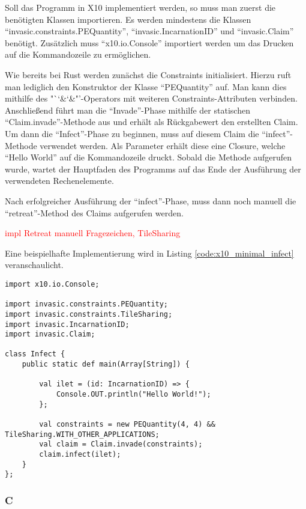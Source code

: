 Soll das Programm in X10 implementiert werden, so muss man zuerst die benötigten Klassen importieren. Es werden 
mindestens die Klassen "`invasic.constraints.PEQuantity"', "`invasic.IncarnationID"' und "`invasic.Claim"'
benötigt. Zusätzlich muss "`x10.io.Console"' importiert werden um das Drucken auf die Kommandozeile zu
ermöglichen.

Wie bereits bei Rust werden zunächst die Constraints initialisiert. Hierzu
ruft man lediglich den Konstruktor der Klasse "`PEQuantity"' auf. Man kann dies mithilfe
des "`\char`&\char`&"'-Operators mit weiteren Constraints-Attributen verbinden.
Anschließend führt man die "`Invade"'-Phase mithilfe der statischen "`Claim.invade"'-Methode aus und erhält
als Rückgabewert den erstellten Claim.
Um dann die "`Infect"'-Phase zu beginnen, muss auf diesem Claim die "`infect"'-Methode verwendet werden.
Als Parameter erhält diese eine Closure, welche "`Hello World"' auf die Kommandozeile druckt.
Sobald die Methode aufgerufen wurde, wartet der Hauptfaden des Programms auf das Ende der Ausführung der
verwendeten Rechenelemente.

Nach erfolgreicher Ausführung der "`infect"'-Phase, muss dann noch manuell die "`retreat"'-Method des Claims
aufgerufen werden.

\textcolor{red}{impl Retreat manuell Fragezeichen, TileSharing}

Eine beispielhafte Implementierung wird in Listing \ref{code:x10_minimal_infect} veranschaulicht.

\begin{lstlisting}[float,caption={Minimales Invade, Infect, Retreat in X10},label=code:x10_minimal_infect]
import x10.io.Console;

import invasic.constraints.PEQuantity;
import invasic.constraints.TileSharing;
import invasic.IncarnationID;
import invasic.Claim;

class Infect {
	public static def main(Array[String]) {

	    val ilet = (id: IncarnationID) => {
	        Console.OUT.println("Hello World!");
	    };

	    val constraints = new PEQuantity(4, 4) && TileSharing.WITH_OTHER_APPLICATIONS;
        val claim = Claim.invade(constraints);
        claim.infect(ilet);
	}
};
\end{lstlisting}

\subsubsection{C}

